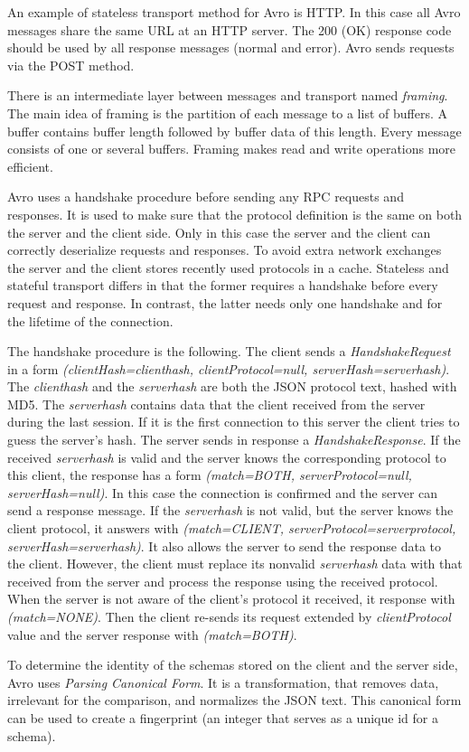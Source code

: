 An example of stateless transport method for Avro is HTTP.
In this case all Avro messages share the same URL at an HTTP server.
The 200 (OK) response code should be used by all response messages (normal and error).
Avro sends requests via the POST method.

There is an intermediate layer between messages and transport named \textit{framing}.
The main idea of framing is the partition of each message to a list of buffers.
A buffer contains buffer length followed by buffer data of this length.
Every message consists of one or several buffers.
Framing makes read and write operations more efficient.

Avro uses a handshake procedure before sending any RPC requests and responses.
It is used to make sure that the protocol definition is the same on both the server and the client side.
Only in this case the server and the client can correctly deserialize requests and responses.
To avoid extra network exchanges the server and the client stores recently used protocols in a cache.
Stateless and stateful transport differs in that the former requires a handshake before every request and response.
In contrast, the latter needs only one handshake and for the lifetime of the connection.

The handshake procedure is the following.
The client sends a \textit{HandshakeRequest} in a form \textit{(clientHash=clienthash, clientProtocol=null, serverHash=serverhash)}.
The \textit{clienthash} and the \textit{serverhash} are both the JSON protocol text, hashed with MD5.
The \textit{serverhash} contains data that the client received from the server during the last session.
If it is the first connection to this server the client tries to guess the server's hash.
The server sends in response a \textit{HandshakeResponse}.
If the received \textit{serverhash} is valid and the server knows the corresponding protocol to this client, the response has a form \textit{(match=BOTH, serverProtocol=null, serverHash=null)}.
In this case the connection is confirmed and the server can send a response message.
If the \textit{serverhash} is not valid, but the server knows the client protocol, it answers with \textit{(match=CLIENT, serverProtocol=serverprotocol, serverHash=serverhash)}.
It also allows the server to send the response data to the client.
However, the client must replace its nonvalid \textit{serverhash} data with that received from the server and process the response using the received protocol.
When the server is not aware of the client's protocol it received, it response with \textit{(match=NONE)}. 
Then the client re-sends its request extended by \textit{clientProtocol} value and the server response with \textit{(match=BOTH)}.

To determine the identity of the schemas stored on the client and the server side, Avro uses \textit{Parsing Canonical Form}.
It is a transformation, that removes data, irrelevant for the comparison, and normalizes the JSON text.
This canonical form can be used to create a fingerprint (an integer that serves as a unique id for a schema). 

 


